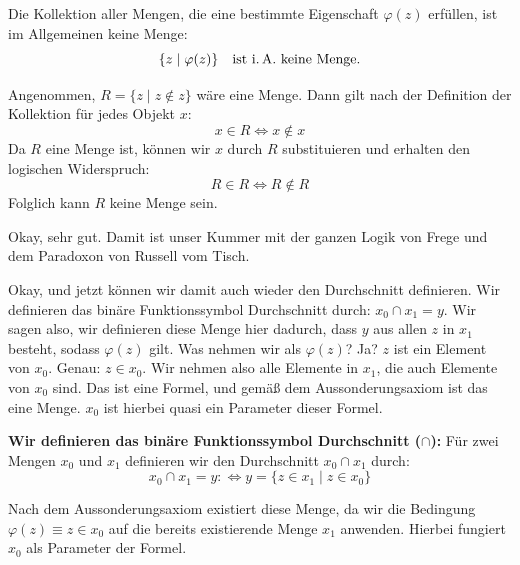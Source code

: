\begin{math-stroke}
\begin{remark}
Die Kollektion aller Mengen, die eine bestimmte Eigenschaft $\varphi(z)$ erfüllen, ist im Allgemeinen keine Menge:
\[
\{ z \mid \varphi(z) \} \quad \text{ist i.\,A.\ keine Menge.}
\]
\end{remark}


\begin{short-proof}
Angenommen, $R = \{ z \mid z \notin z \}$ wäre eine Menge. Dann gilt nach der Definition der Kollektion für jedes Objekt $x$:
\[
x \in R \iff x \notin x
\]
Da $R$ eine Menge ist, können wir $x$ durch $R$ substituieren und erhalten den logischen Widerspruch:
\[
R \in R \iff R \notin R
\]
Folglich kann $R$ keine Menge sein.
\end{short-proof}
\end{math-stroke}

\begin{spoken-clean}[00:32:45 - 00:33:09]
Okay, sehr gut. Damit ist unser Kummer mit der ganzen Logik von Frege und dem Paradoxon von Russell vom Tisch.
\end{spoken-clean}

\begin{spoken-clean}[00:33:09 - 00:35:00]
Okay, und jetzt können wir damit auch wieder den Durchschnitt definieren. Wir definieren das binäre Funktionssymbol Durchschnitt durch: $x_0 \cap x_1 = y$. Wir sagen also, wir definieren diese Menge hier dadurch, dass $y$ aus allen $z$ in $x_1$ besteht, sodass $\varphi(z)$ gilt. Was nehmen wir als $\varphi(z)$? Ja? $z$ ist ein Element von $x_0$. Genau: $z \in x_0$. Wir nehmen also alle Elemente in $x_1$, die auch Elemente von $x_0$ sind. Das ist eine Formel, und gemäß dem Aussonderungsaxiom ist das eine Menge. $x_0$ ist hierbei quasi ein Parameter dieser Formel.
\end{spoken-clean}

\begin{math-stroke}
\textbf{Wir definieren das binäre Funktionssymbol Durchschnitt ($\cap$):}
Für zwei Mengen $x_0$ und $x_1$ definieren wir den Durchschnitt $x_0 \cap x_1$ durch:
\[
x_0 \cap x_1 = y :\iff y = \{ z \in x_1 \mid z \in x_0 \}
\]
\begin{explanation-of-steps}
Nach dem Aussonderungsaxiom existiert diese Menge, da wir die Bedingung $\varphi(z) \equiv z \in x_0$ auf die bereits existierende Menge $x_1$ anwenden. Hierbei fungiert $x_0$ als Parameter der Formel.
\end{explanation-of-steps}
\end{math-stroke}

